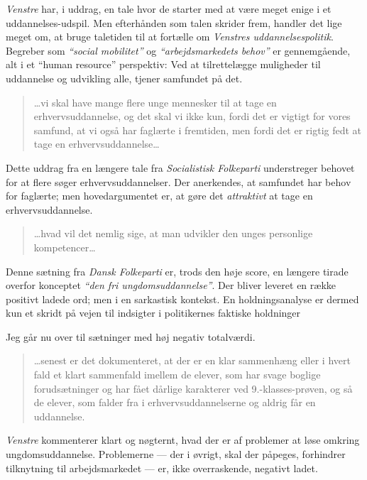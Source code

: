 \textit{Venstre} har, i uddrag, en tale hvor de starter med at være meget enige i et uddannelses-udspil.
Men efterhånden som talen skrider frem, handler det lige meget om, at bruge taletiden til at fortælle om \textit{Venstres uddannelsespolitik}.
Begreber som \textit{“social mobilitet”} og \textit{“arbejdsmarkedets behov”} er gennemgående, alt i et “human resource” perspektiv:
Ved at tilrettelægge muligheder til uddannelse og udvikling alle, tjener samfundet på det.

\begin{quotation}
\ldots vi skal have mange flere unge mennesker til at tage en erhvervsuddannelse, og det skal vi ikke kun, fordi det er vigtigt for vores samfund, at vi også har faglærte i fremtiden, men fordi det er rigtig fedt at tage en erhvervsuddannelse\ldots
{}
\end{quotation}

Dette uddrag fra en længere tale fra \textit{Socialistisk Folkeparti} understreger behovet for at flere søger erhvervsuddannelser.
Der anerkendes, at samfundet har behov for faglærte; men hovedargumentet er, at gøre det \textit{attraktivt} at tage en erhvervsuddannelse.

\begin{quotation}
\ldots hvad vil det nemlig sige, at man udvikler den unges personlige kompetencer\ldots
{}
\end{quotation}
Denne sætning fra \textit{Dansk Folkeparti} er, trods den høje score, en længere tirade overfor konceptet \textit{“den fri ungdomsuddannelse”}.
Der bliver leveret en række positivt ladede ord; men i en sarkastisk kontekst.
En holdningsanalyse er dermed kun et skridt på vejen til indsigter i politikernes faktiske holdninger

Jeg går nu over til sætninger med høj negativ totalværdi.

\begin{quotation}
\ldots senest er det dokumenteret, at der er en klar sammenhæng eller i hvert fald et klart sammenfald imellem de elever, som har svage boglige forudsætninger og har fået dårlige karakterer ved 9.-klasses-prøven, og så de elever, som falder fra i erhvervsuddannelserne og aldrig får en uddannelse.
\end{quotation}

\textit{Venstre} kommenterer klart og nøgternt, hvad der er af problemer at løse omkring ungdomsuddannelse.
Problemerne --- der i øvrigt, skal der påpeges, forhindrer tilknytning til arbejdsmarkedet — er, ikke overraskende, negativt ladet.

